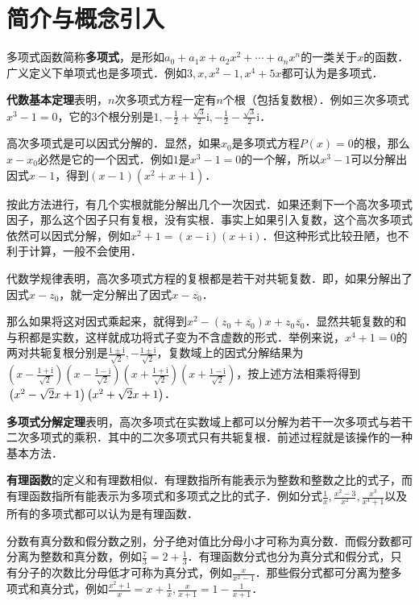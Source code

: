 \documentclass{ctexbook}
\begin{document}
\section{简介与概念引入}
多项式函数简称\textbf{多项式}，是形如$a_{0}+a_{1}x+a_{2}x^{2}+\cdots+a_{n}x^{n}$的一类关于$x$的函数．广义定义下单项式也是多项式．例如$3, x,x^{2}-1,x^{4}+5x$都可认为是多项式．\par
\textbf{代数基本定理}表明，$n$次多项式方程一定有$n$个根（包括复数根）．例如三次多项式$x^{3}-1=0$，它的3个根分别是$1,-\frac{1}{2}+\frac{\sqrt{3}}{2}\mathrm{i},-\frac{1}{2}-\frac{\sqrt{3}}{2}\mathrm{i}$．\par
高次多项式是可以因式分解的．显然，如果$x_{0}$是多项式方程$P\left(x\right)=0$的根，那么$x-x_{0}$必然是它的一个因式．例如$1$是$x^{3}-1=0$的一个解，所以$x^{3}-1$可以分解出因式$x-1$，得到$\left(x-1\right)\left(x^{2}+x+1\right)$．\par
按此方法进行，有几个实根就能分解出几个一次因式．如果还剩下一个高次多项式因子，那么这个因子只有复根，没有实根．事实上如果引入复数，这个高次多项式依然可以因式分解，例如$x^{2}+1=\left(x-\mathrm{i}\right)\left(x+\mathrm{i}\right)$．但这种形式比较丑陋，也不利于计算，一般不会使用．\par
代数学规律表明，高次多项式方程的复根都是若干对共轭复数．即，如果分解出了因式$x-z_{0}$，就一定分解出了因式$x-\overline{z_{0}}$．\par
那么如果将这对因式乘起来，就得到$x^{2}-\left(z_{0}+\overline{z_{0}}\right)x+z_{0}\overline{z_{0}}$．显然共轭复数的和与积都是实数，这样就成功将式子变为不含虚数的形式．举例来说，$x^{4}+1=0$的两对共轭复根分别是$\frac{1\pm\mathrm{i}}{\sqrt{2}},-\frac{1\pm\mathrm{i}}{\sqrt{2}}$，复数域上的因式分解结果为$\left(x-\frac{1+\mathrm{i}}{\sqrt{2}}\right)\left(x-\frac{1-\mathrm{i}}{\sqrt{2}}\right)\left(x+\frac{1+\mathrm{i}}{\sqrt{2}}\right)\left(x+\frac{1-\mathrm{i}}{\sqrt{2}}\right)$，按上述方法相乘将得到$\\\left(x^{2}-\sqrt{2}x+1\right)\left(x^{2}+\sqrt{2}x+1\right)$．\par
\textbf{多项式分解定理}表明，高次多项式在实数域上都可以分解为若干一次多项式与若干二次多项式的乘积．其中的二次多项式只有共轭复根．前述过程就是该操作的一种基本方法．\par
\textbf{有理函数}的定义和有理数相似．有理数指所有能表示为整数和整数之比的式子，而有理函数指所有能表示为多项式和多项式之比的式子．例如分式$\frac{1}{x},\frac{x^{2}-3}{x^{2}},\frac{x^{3}}{x^{4}+1}$以及所有的多项式都可以认为是有理函数．\par
分数有真分数和假分数之别，分子绝对值比分母小才可称为真分数．而假分数都可分离为整数和真分数，例如$\frac{7}{3}=2+\frac{1}{3}$．有理函数分式也分为真分式和假分式，只有分子的次数比分母低才可称为真分式，例如$\frac{x}{x^{2}-1}$．那些假分式都可分离为整多项式和真分式，例如$\frac{x^{2}+1}{x}=x+\frac{1}{x},\frac{x}{x+1}=1-\frac{1}{x+1}$．
\end{document}
